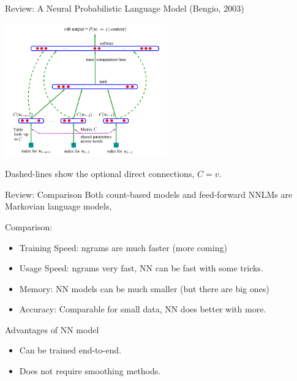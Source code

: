 \documentclass{beamer}
\begin{document}
\begin{frame}{Review: A Neural Probabilistic Language Model (Bengio, 2003)}  
  \begin{center}
    \includegraphics[width=7cm]{bengio}
  \end{center}
  Dashed-lines show the optional direct connections, $C = v$.
\end{frame}


\begin{frame}{Review: Comparison}
  Both count-based models and feed-forward NNLMs are Markovian language models, 

  Comparison:
  \begin{itemize}
  \item Training Speed: ngrams are much faster (more coming)
  \item Usage Speed: ngrams very fast, NN can be fast with some tricks. 
  \item Memory: NN models can be much smaller (but there are big ones)
  \item Accuracy: Comparable for small data, NN does better with more.
  \end{itemize}
  
  Advantages of NN model
  \begin{itemize}
  \item Can be trained end-to-end.
    \air 
  \item Does not require smoothing methods.
  \end{itemize}


\end{frame}
\end{document}
